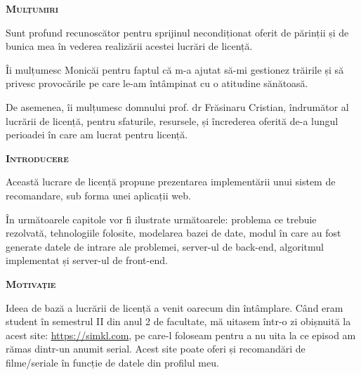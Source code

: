 \documentclass[12pt,a4paper]{report}
\begin{document}
\hfill \break
	\begin{center}
	{\scshape\large \textbf{Mulțumiri} \par}
	\end{center}
	
\begin{flushright}
\hfill \break
\hfill \break
Sunt profund recunoscător pentru sprijinul necondiționat oferit de părinții și de bunica mea în vederea realizării acestei lucrări de licență.
\end{flushright}
\hfill \break
\hfill \break
\hfill \break
\begin{flushright}
Îi mulțumesc Monicăi pentru faptul că m-a ajutat să-mi gestionez trăirile și să privesc provocările pe care le-am întâmpinat cu o atitudine sănătoasă.
\hfill \break
\hfill \break
\hfill \break
\end{flushright}
\begin{flushright}
De asemenea, îi mulțumesc domnului prof. dr Frăsinaru Cristian, îndrumător al lucrării de licență, pentru sfaturile, resursele, și încrederea oferită de-a lungul perioadei în care am lucrat pentru licență.
\end{flushright}

\newpage
   
\renewcommand*{\contentsname}{Cuprins}
\tableofcontents
\newpage

\hfill \break

	\hfill \break
	\begin{center}
	{\scshape\large \textbf{Introducere} \par}
	\end{center}
	
	Această lucrare de licență propune prezentarea implementării unui sistem de recomandare, sub forma unei aplicații web.
	
	În următoarele capitole vor fi ilustrate următoarele: problema ce trebuie rezolvată, tehnologiile folosite, modelarea bazei de date, modul în care au fost generate datele de intrare ale problemei, server-ul de back-end, algoritmul implementat și server-ul de front-end.
	
	\begin{center}
	{\scshape\large \textbf{Motivație} \par}
	\end{center}

	Ideea de bază a lucrării de licență a venit oarecum din întâmplare. Când eram student în semestrul II din anul 2 de facultate, mă uitasem într-o zi obișnuită la acest site: \href{https://simkl.com/}{https://simkl.com}, pe care-l foloseam pentru a nu uita la ce episod am rămas dintr-un anumit serial. Acest site poate oferi și recomandări de filme/seriale în funcție de datele din profilul meu.
	
\end{document}
